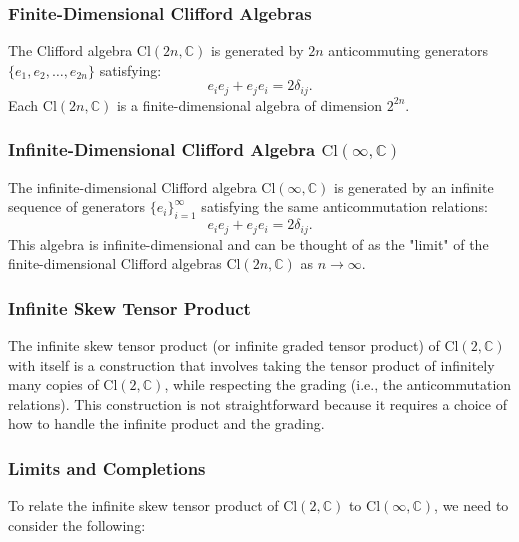\documentclass{article}
\begin{document}
\subsubsection{Finite-Dimensional Clifford Algebras}

The Clifford algebra $\text{Cl}(2n, \mathbb{C})$ is generated by $2n$
anticommuting generators $\{e_1, e_2, \dots, e_{2n}\}$ satisfying: 
\begin{equation*}
e_i e_j + e_j e_i = 2 \delta_{ij}. 
\end{equation*}
Each $\text{Cl}(2n, \mathbb{C})$ is a finite-dimensional algebra of
dimension $2^{2n}$.

\subsubsection{Infinite-Dimensional Clifford Algebra $\text{Cl}(\infty, 
\mathbb{C})$}

The infinite-dimensional Clifford algebra $\text{Cl}(\infty, \mathbb{C})$ is
generated by an infinite sequence of generators $\{e_i\}_{i=1}^\infty$
satisfying the same anticommutation relations: 
\begin{equation*}
e_i e_j + e_j e_i = 2 \delta_{ij}. 
\end{equation*}
This algebra is infinite-dimensional and can be thought of as the "limit" of
the finite-dimensional Clifford algebras $\text{Cl}(2n, \mathbb{C})$ as $n
\to \infty$.

\subsubsection{Infinite Skew Tensor Product}

The infinite skew tensor product (or infinite graded tensor product) of $%
\text{Cl}(2, \mathbb{C})$ with itself is a construction that involves taking
the tensor product of infinitely many copies of $\text{Cl}(2, \mathbb{C})$,
while respecting the grading (i.e., the anticommutation relations). This
construction is not straightforward because it requires a choice of how to
handle the infinite product and the grading.

\subsubsection{Limits and Completions}

To relate the infinite skew tensor product of $\text{Cl}(2, \mathbb{C})$ to $%
\text{Cl}(\infty, \mathbb{C})$, we need to consider the following:
\end{document}
